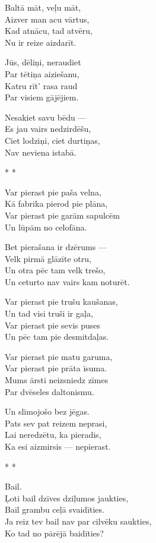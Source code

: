 \documentclass[14pt]{extarticle}
\begin{document}
Baltā māt, veļu māt,\\
Aizver man acu vārtus,\\
Kad atnācu, tad atvēru,\\
Nu ir reize aizdarīt.

Jūs, dēliņi, neraudiet\\
Par tētiņa aiziešanu,\\
Katru rīt' rasa raud\\
Par visiem gājējiem.

Nesakiet savu bēdu ---\\
Es jau vairs nedzirdēšu,\\
Ciet lodziņi, ciet durtiņas,\\
Nav neviena istabā.


\newpage

{\large \sc * * *} 

Var pierast pie paša velna,\\
Kā fabrika pierod pie plāna,\\
Var pierast pie garām sapulcēm\\
Un lūpām no celofāna.

Bet pierašana ir dzērums ---\\
Velk pirmā glāzīte otru,\\
Un otra pēc tam velk trešo,\\
Un ceturto nav vairs kam noturēt.

Var pierast pie trušu kaušanas,\\
Un tad visi truši ir gaļa,\\
Var pierast pie sevis puses\\
Un pēc tam pie desmitdaļas.

Var pierast pie matu garuma,\\
Var pierast pie prāta īsuma.\\
Mums ārsti neizsniedz zīmes\\
Par dvēseles daltonismu.

Un slimojošo bez jēgas.\\
Pats sev pat reizem neprasi,\\
Lai neredzētu, ka pieradis,\\
Ka esi aizmirsis --- nepierast.



\newpage

{\large \sc * * *}

Bail.\\
Ļoti bail dzīves dziļumos jaukties,\\
Bail grambu ceļā svaidīties.\\
Ja reiz tev bail nav par cilvēku saukties,\\
Ko tad no pārējā baidīties?
\end{document}
